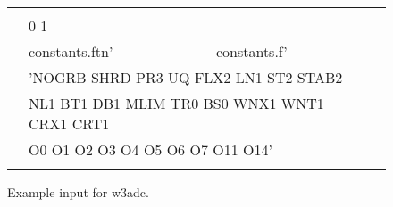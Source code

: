\setlength{\unitlength}{0.1mm}

\begin{figure}

\begin{center} {\code \begin{tabular}{|cllc|} \hline
 & & &  \\
 & \multicolumn{2}{l}{0 1}        & \\ 
 & constants.ftn' & constants.f'  & \\
 & \multicolumn{2}{l}{'NOGRB SHRD PR3 UQ FLX2 LN1 ST2 STAB2}& \\
 & \multicolumn{2}{l}{\strut\hspace{5mm} NL1 BT1 DB1 MLIM TR0 BS0 WNX1 WNT1 CRX1 CRT1 }& \\
 & \multicolumn{2}{l}{\strut\hspace{5mm} O0 O1 O2 O3 O4 O5 O6 O7 O11 O14'}& \\
 &               &             & \\ \hline
\end{tabular} } \end{center} 
\caption{Example input for {\F w3adc}.} \label{fig:w3adc}

\botline
\end{figure}
